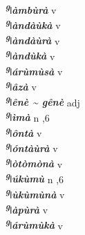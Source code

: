 \begin{multicols}{2}
{{\bfseries\itshape \textsuperscript{g}{ǀ}àmbùrà}} \relax  v  \relax  {} \relax   \relax  \\
{{\bfseries\itshape \textsuperscript{g}{ǀ}àndàùkà}} \relax  v  \relax   \relax  {} \relax   \relax  \\
{{\bfseries\itshape \textsuperscript{g}{ǀ}àndàùrà}} \relax  v  \relax   \relax  {} \relax   \relax  \\
{{\bfseries\itshape \textsuperscript{g}{ǀ}àndùkà}} \relax  v  \relax   \relax  {} \relax   \relax  \\
{{\bfseries\itshape \textsuperscript{g}{ǀ}árùmùsà}} \relax  v  \relax   \relax  {} \relax   \relax  \\
{{\bfseries\itshape \textsuperscript{g}{ǀ}âzà}} \relax  v  \relax   \relax  {} \relax   \relax  \\
{{\bfseries\itshape \textsuperscript{g}{ǀ}ênè {\textasciitilde} gênè}} \relax  adj  \relax   \relax  {} \relax   \relax  \\
{{\bfseries\itshape \textsuperscript{g}{ǀ}ìmà}} \relax  n  ,6  \relax   \relax  \\
{{\bfseries\itshape \textsuperscript{g}{ǀ}ôntà}} \relax  v  \relax   \relax  {} \relax   \relax  \\
{{\bfseries\itshape \textsuperscript{g}{ǀ}óntàùrà}} \relax  v  \relax   \relax  {} \relax   \relax  \\
{{\bfseries\itshape \textsuperscript{g}{ǀ}òtòmònà}} \relax  v  \relax   \relax  {} \relax   \relax  \\
{{\bfseries\itshape \textsuperscript{g}{ǀ}úkùmù}} \relax  n  ,6  \relax   \relax  \\
{{\bfseries\itshape \textsuperscript{g}{ǀ}ùkùmùnà}} \relax  v  \relax  {} \relax   \relax  \\
{{\bfseries\itshape \textsuperscript{g}{ǀ}àpùrà}} \relax  v  \relax   \relax  {} \relax   \relax  \\
{{\bfseries\itshape \textsuperscript{g}{ǀ}árùmùkà}} \relax  v  \relax   \relax  {} \relax   \relax  \\

\end{multicols}
